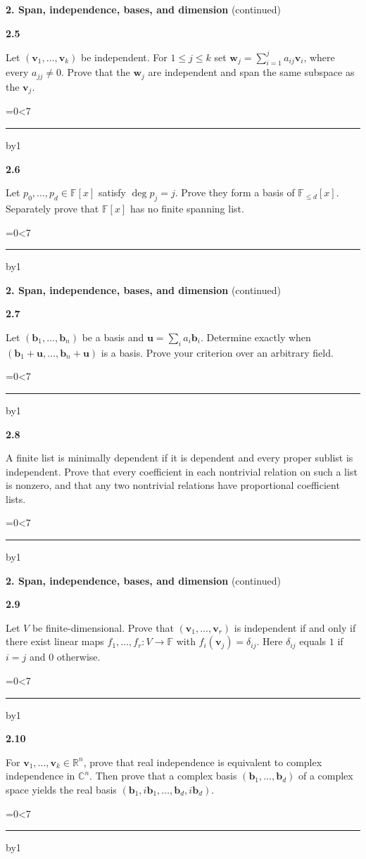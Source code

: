 \documentclass[11pt,letterpaper]{article}
\newcommand{\topicshort}{Problem collection}
\newcommand{\F}{\mathbb F}\newcommand{\R}{\mathbb R}\newcommand{\Q}{\mathbb Q}\newcommand{\C}{\mathbb C}\newcommand{\Z}{\mathbb Z}
\newcommand{\ruled}[1]{\par\begingroup\parskip=0pt\baselineskip=17pt\count255=0\loop\ifnum\count255<#1\noindent\textcolor{black!17}{\rule{\linewidth}{.25pt}}\par\advance\count255 by1\repeat\endgroup}
\newcommand{\problem}[4]{\noindent\begin{minipage}[t][3.48in][t]{\linewidth}\textbf{\color{navy}#1}\quad{\small\sffamily\color{teal}#2#3}\par #4\par\vfill\ruled{7}\end{minipage}}
\begin{document}
\newpage
\renewcommand{\topicshort}{Lists and bases}
{\large\bfseries\color{navy}2. Span, independence, bases, and dimension} {\small(continued)}\par\vspace{9pt}
\problem{2.5}{M}{}{Let $(\mathbf v_1,\ldots,\mathbf v_k)$ be independent. For $1\le j\le k$ set $\mathbf w_j=\sum_{i=1}^j a_{ij}\mathbf v_i$, where every $a_{jj}\ne0$. Prove that the $\mathbf w_j$ are independent and span the same subspace as the $\mathbf v_j$.}
\par\vspace{14pt}
\problem{2.6}{M}{}{Let $p_0,\ldots,p_d\in\F[x]$ satisfy $\deg p_j=j$. Prove they form a basis of $\F_{\le d}[x]$. Separately prove that $\F[x]$ has no finite spanning list.}
\newpage
\renewcommand{\topicshort}{Lists and bases}
{\large\bfseries\color{navy}2. Span, independence, bases, and dimension} {\small(continued)}\par\vspace{9pt}
\problem{2.7}{M}{}{Let $(\mathbf b_1,\ldots,\mathbf b_n)$ be a basis and $\mathbf u=\sum_i a_i\mathbf b_i$. Determine exactly when $(\mathbf b_1+\mathbf u,\ldots,\mathbf b_n+\mathbf u)$ is a basis. Prove your criterion over an arbitrary field.}
\par\vspace{14pt}
\problem{2.8}{M}{}{A finite list is minimally dependent if it is dependent and every proper sublist is independent. Prove that every coefficient in each nontrivial relation on such a list is nonzero, and that any two nontrivial relations have proportional coefficient lists.}
\newpage
\renewcommand{\topicshort}{Lists and bases}
{\large\bfseries\color{navy}2. Span, independence, bases, and dimension} {\small(continued)}\par\vspace{9pt}
\problem{2.9}{M}{}{Let $V$ be finite-dimensional. Prove that $(\mathbf v_1,\ldots,\mathbf v_r)$ is independent if and only if there exist linear maps $f_1,\ldots,f_r:V\to\F$ with $f_i(\mathbf v_j)=\delta_{ij}$. Here $\delta_{ij}$ equals $1$ if $i=j$ and $0$ otherwise.}
\par\vspace{14pt}
\problem{2.10}{M}{}{For $\mathbf v_1,\ldots,\mathbf v_k\in\R^n$, prove that real independence is equivalent to complex independence in $\C^n$. Then prove that a complex basis $(\mathbf b_1,\ldots,\mathbf b_d)$ of a complex space yields the real basis $(\mathbf b_1,i\mathbf b_1,\ldots,\mathbf b_d,i\mathbf b_d)$.}
\newpage
\renewcommand{\topicshort}{Lists and bases}
\end{document}
